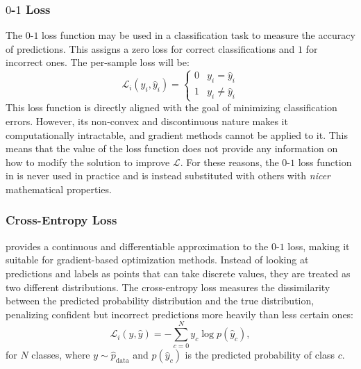 
\subsubsection{$0$-$1$ Loss} The $0$-$1$ loss function may be used in a classification task to measure the accuracy of predictions. This assigns a zero loss for correct classifications and $1$ for incorrect ones. The per-sample loss will be:
\begin{equation}
    \mathcal{L}_i(y_i,\hat{y}_i)=     \begin{cases}
      0 & y_i = \hat{y}_i\\
      1 & y_i \neq \hat{y}_i
    \end{cases}
    \label{eq:01loss}
\end{equation} 
This loss function is directly aligned with the goal of minimizing classification errors. However, its non-convex and discontinuous nature makes it computationally intractable, and gradient methods cannot be applied to it. This means that the value of the loss function does not provide any information on how to modify the solution to improve $\mathcal{L}$. For these reasons, the $0$-$1$ loss function in  is never used in practice and is instead substituted with others with \textit{nicer} mathematical properties.

\subsubsection{Cross-Entropy Loss} provides a continuous and differentiable approximation to the $0$-$1$ loss, making it suitable for gradient-based optimization methods. Instead of looking at predictions and labels as points that can take discrete values, they are treated as two different distributions. The cross-entropy loss measures the dissimilarity between the predicted probability distribution and the true distribution, penalizing confident but incorrect predictions more heavily than less certain ones:
\begin{equation}
    \mathcal{L}_i(y,\hat{y})= -\sum_{c=0}^N y_c\log p(\hat{y}_c),
    \label{eq:celoss}
\end{equation}
for $N$ classes, where $y \sim \hat{p}_\text{data}$ and $p(\hat{y}_c)$ is the predicted probability of class $c$.

